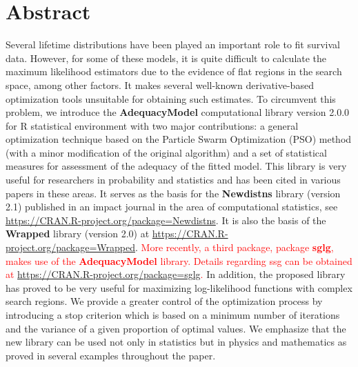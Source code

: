 \documentclass[10pt,letterpaper]{article}
\begin{document}
\section*{Abstract}
Several lifetime distributions have been played an important role to fit survival data. However, for some of these models, it is quite difficult to calculate the maximum likelihood estimators due to the evidence of flat regions in the search space, among other factors. It makes several well-known derivative-based optimization tools unsuitable for obtaining such estimates. To circumvent this problem, we introduce the \textbf{AdequacyModel} computational library version 2.0.0 for \textsc{R} statistical environment with two major contributions: a general optimization technique based on the Particle Swarm Optimization (PSO) method (with a minor modification of the original algorithm) and a set of statistical measures for assessment of the adequacy of the fitted model. This library is very useful for researchers in pro\-bability and statistics and has been cited in various papers in these areas. It serves as the basis for the \textbf{Newdistns} library (version 2.1) published in an impact journal in the area of computational statistics, see \url{https://CRAN.R-project.org/package=Newdistns}. It is also the basis of the \textbf{Wrapped} library (version 2.0) at \url{https://CRAN.R-project.org/package=Wrapped}. \textcolor{red}{More recently, a third package, package \textbf{sglg}, makes use of the \textbf{AdequacyModel} library. Details regarding ssg can be obtained at \url{https://CRAN.R-project.org/package=sglg}.} In addition, the proposed library has proved to be very useful for maximizing log-likelihood functions with complex search regions. We provide a greater control of the optimization process by introducing a stop criterion which is based on a minimum number of iterations and the variance of a given proportion of optimal values. We emphasize that the new library can be used not only in statistics but in physics and mathematics as proved in several examples throughout the paper.
\end{document}
